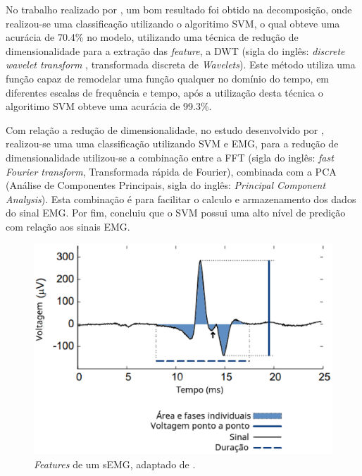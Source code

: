 No trabalho realizado por , um bom resultado foi obtido na decomposição, onde realizou-se uma classificação utilizando o algoritimo SVM, o qual obteve uma acurácia de 70.4\% no modelo, utilizando uma técnica de redução de dimensionalidade para a extração das \textit{feature}, a DWT (sigla do inglês: \textit{discrete wavelet transform }, transformada discreta de \textit{Wavelets}). Este método utiliza uma função capaz de remodelar uma função qualquer no domínio do tempo, em diferentes escalas de frequência e tempo, após a utilização desta técnica o algoritimo SVM obteve uma acurácia de 99.3\%.

Com relação a redução de dimensionalidade, no estudo desenvolvido por , realizou-se uma uma classificação utilizando SVM e EMG, para a redução de dimensionalidade utilizou-se a combinação entre a FFT (sigla do inglês: \textit{fast Fourier transform}, Transformada rápida de Fourier), combinada com a PCA (Análise de Componentes Principais, sigla do inglês: \textit{Principal Component Analysis}). Esta combinação é para facilitar o calculo e armazenamento dos dados do sinal EMG. Por fim,  concluiu que o SVM possui uma alto nível de predição com relação aos sinais EMG.

\begin{figure}[h]
    \centering
     \includegraphics[width=1\textwidth]{figuras/featuresEMG.eps}
     \caption{\textit{Features} de um sEMG, adaptado de .}
     \label{featuresEMG}
 \end{figure}

